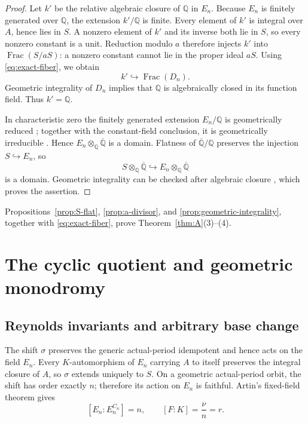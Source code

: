 \documentclass[11pt]{article}
\theoremstyle{definition}
\theoremstyle{remark}
\newcommand{\Q}{\mathbb{Q}}
\newcommand{\Qbar}{\overline{\mathbb{Q}}}
\newcommand{\Frac}{\operatorname{Frac}}
\begin{document}
\begin{proof}
Let $k'$ be the relative algebraic closure of $\Q$ in $E_n$.  Because
$E_n$ is finitely generated over $\Q$, the extension $k'/\Q$ is finite.
Every element of $k'$ is integral over $A$, hence lies in $S$.  A nonzero
element of $k'$ and its inverse both lie in $S$, so every nonzero constant is
a unit.  Reduction modulo $a$ therefore injects $k'$ into
$\Frac(S/aS)$: a nonzero constant cannot lie in the proper ideal $aS$.
Using \eqref{eq:exact-fiber}, we obtain
\[
 k'\hookrightarrow\Frac(D_n).
\]
Geometric integrality of $D_n$ implies that $\Q$ is algebraically closed in
its function field.  Thus $k'=\Q$.

In characteristic zero the finitely generated extension $E_n/\Q$ is
geometrically reduced \citep{stacks-0322}; together with the constant-field
conclusion, it is geometrically irreducible \citep{stacks-037p}.  Hence
$E_n\otimes_\Q\Qbar$ is a domain.  Flatness of $\Qbar/\Q$ preserves the
injection $S\hookrightarrow E_n$, so
\[
 S\otimes_\Q\Qbar\hookrightarrow E_n\otimes_\Q\Qbar
\]
is a domain.  Geometric integrality can be checked after algebraic closure
\citep{stacks-0fwf}, which proves the assertion.
\end{proof}

Propositions~\ref{prop:S-flat}, \ref{prop:a-divisor}, and
\ref{prop:geometric-integrality}, together with
\eqref{eq:exact-fiber}, prove Theorem~\ref{thm:A}(3)--(4).

\section{The cyclic quotient and geometric monodromy}\label{sec:quotient}

\subsection{Reynolds invariants and arbitrary base change}

The shift $\sigma$ preserves the generic actual-period idempotent and hence
acts on the field $E_n$.  Every $K$-automorphism of $E_n$ carrying $A$ to
itself preserves the integral closure of $A$, so $\sigma$ extends uniquely
to $S$.  On a geometric actual-period orbit, the shift has order exactly
$n$; therefore its action on $E_n$ is faithful.  Artin's fixed-field theorem
gives
\begin{equation}\label{eq:fixed-field-degree}
 [E_n:E_n^{C_n}]=n,\qquad [F:K]=\frac{\nu}{n}=r.
\end{equation}
\end{document}
